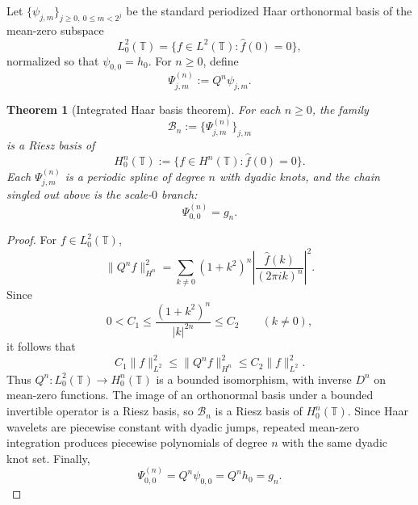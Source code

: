 \documentclass[11pt,a4paper]{article}
\numberwithin{equation}{section}
\newtheorem{theorem}{Theorem}[section]
\theoremstyle{definition}
\theoremstyle{remark}
\begin{document}
Let $\{\psi_{j,m}\}_{j\ge 0,\ 0\le m<2^j}$ be the standard periodized Haar orthonormal basis of the mean-zero subspace
\[
L^2_0(\mathbb T)=\{f\in L^2(\mathbb T):\widehat f(0)=0\},
\]
normalized so that $\psi_{0,0}=h_0$.  For $n\ge 0$, define
\[
\Psi_{j,m}^{(n)}:=Q^n\psi_{j,m}.
\]

\begin{theorem}[Integrated Haar basis theorem]\label{mod:haar-basis}
For each $n\ge 0$, the family
\[
\mathcal B_n:=\{\Psi_{j,m}^{(n)}\}_{j,m}
\]
is a Riesz basis of
\[
H_0^n(\mathbb T):=\{f\in H^n(\mathbb T):\widehat f(0)=0\}.
\]
Each $\Psi_{j,m}^{(n)}$ is a periodic spline of degree $n$ with dyadic knots, and the chain singled out above is the scale-$0$ branch:
\[
\Psi_{0,0}^{(n)}=g_n.
\]
\end{theorem}

\begin{proof}
For $f\in L^2_0(\mathbb T)$,
\[
\|Q^n f\|_{H^n}^2
=
\sum_{k\neq 0}(1+k^2)^n\left|\frac{\widehat f(k)}{(2\pi ik)^n}\right|^2.
\]
Since
\[
0<C_1\le \frac{(1+k^2)^n}{|k|^{2n}}\le C_2
\qquad (k\neq 0),
\]
it follows that
\[
C_1\|f\|_{L^2}^2\le \|Q^n f\|_{H^n}^2\le C_2\|f\|_{L^2}^2.
\]
Thus $Q^n:L^2_0(\mathbb T)\to H_0^n(\mathbb T)$ is a bounded isomorphism, with inverse $D^n$ on mean-zero functions.  The image of an orthonormal basis under a bounded invertible operator is a Riesz basis, so $\mathcal B_n$ is a Riesz basis of $H_0^n(\mathbb T)$.  Since Haar wavelets are piecewise constant with dyadic jumps, repeated mean-zero integration produces piecewise polynomials of degree $n$ with the same dyadic knot set.  Finally,
\[
\Psi_{0,0}^{(n)}=Q^n\psi_{0,0}=Q^n h_0=g_n.
\]
\end{proof}
\end{document}
